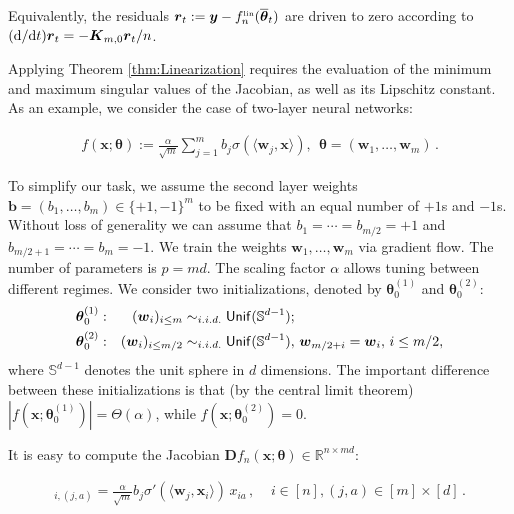 Equivalently, the residuals ${\boldsymbol r}_t:={\boldsymbol y}-f^{\mbox{\rm\tiny lin}}_{n}(\overline{\boldsymbol \theta}_t)$ are driven to zero according to
$({\rm d}/{\rm d} t){\boldsymbol r}_t=-{\boldsymbol K}_{m,0}{\boldsymbol r}_t/n$.

Applying  Theorem \ref{thm:Linearization}  requires the evaluation of the minimum and maximum singular values of the Jacobian, as well as its Lipschitz constant. As an example, we consider the case of two-layer neural networks:

\begin{align}

  f({\boldsymbol x};{\boldsymbol \theta}) := \frac{\alpha}{\sqrt{m}}\sum_{j=1}^m b_j\sigma(\langle{\boldsymbol w}_j,{\boldsymbol x}\rangle),~~
  {\boldsymbol \theta}= ({\boldsymbol w}_1,\dots,{\boldsymbol w}_m)\, .\label{eq:Two-Layers-Net}

\end{align}

To simplify our task, we assume the second layer weights ${\boldsymbol b} =(b_1,\dots,b_m)\in \{+1,-1\}^m$
to be fixed with an equal number of $+1$s and $-1$s. Without loss of generality we can assume  that
$b_1=\cdots=b_{m/2}=+1$ and $b_{m/2+1}=\cdots=b_{m}=-1$. 
We train the weights ${\boldsymbol w}_1,\dots, {\boldsymbol w}_m$ via gradient flow. The number of parameters is $p=md$. The scaling factor $\alpha$ allows tuning between different regimes. We consider two initializations, denoted by ${\boldsymbol \theta}_0^{(1)}$ and ${\boldsymbol \theta}_0^{(2)}$:
  \begin{align}
    {\boldsymbol \theta}_0^{(1)}:&&  ({\boldsymbol w}_i)_{i\le m}&\sim_{i.i.d.} {\sf Unif}({\mathbb S}^{d-1});\\
    {\boldsymbol \theta}_0^{(2)}:&&  ({\boldsymbol w}_i)_{i\le m/2}&\sim_{i.i.d.}
    {\sf Unif}({\mathbb S}^{d-1}),\, {\boldsymbol w}_{m/2+i}={\boldsymbol w}_{i},\, i\le m/2,
  \end{align}
where ${\mathbb S}^{d-1}$ denotes the unit sphere in $d$ dimensions. The important difference between these initializations is that (by the central limit theorem)
$|f({\boldsymbol x};{\boldsymbol \theta}_0^{(1)})| = \Theta(\alpha)$,
while $f({\boldsymbol x};{\boldsymbol \theta}_0^{(2)}) = 0$.

It is easy to compute the Jacobian ${\boldsymbol D} f_n({\boldsymbol x};{\boldsymbol \theta})\in{\mathbb R}^{n\times md}$:

\begin{align}
  [{\boldsymbol D} f_n({\boldsymbol x};{\boldsymbol \theta})]_{i,(j,a)} = \frac{\alpha}{\sqrt{m}} b_j\sigma'(\langle{\boldsymbol w}_j,{\boldsymbol x}_i\rangle)\, x_{ia}\, ,\;\;\;\;
  i\in [n], (j,a)\in [m]\times [d]\, .\label{eq:TwoLayersJacobian}

\end{align}

